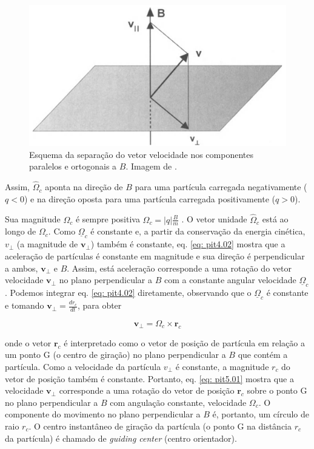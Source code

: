 \documentclass[12pt,oneside,a4paper]{abntex2}
\begin{document}
\begin{figure}[h]
\centering
\includegraphics[scale=0.6]{deconposisao.png} 
\caption{Esquema da separação do vetor velocidade nos componentes paralelos e ortogonais a $B$. Imagem de \cite[Cap 2]{bittencourt}.}
\end{figure}

Assim, $\hat{\Omega}_c$ aponta na direção de $B$ para uma partícula carregada negativamente
($q < 0$) e na direção oposta para uma partícula carregada positivamente ($q > 0$).

Sua magnitude $\Omega_c$ é sempre positiva $\Omega_c = |q| \frac{B}{m}$ . O vetor unidade $\hat{\Omega}_c$ está ao longo de $\Omega_c$.
Como $\underline{\Omega}_c$ é constante e, a partir da conservação da energia cinética,  $v_{\bot}$ (a
magnitude de $ \bm{v}_{\bot}$) também é constante, eq. \ref{eq: pit4.02} mostra que a aceleração de partículas
é constante em magnitude e sua direção é perpendicular a ambos, $\bm{v}_{\bot}$ e $B$. Assim, está aceleração corresponde a uma rotação do vetor velocidade $\bm{v}_{\bot}$ no plano perpendicular a $B$ com a constante angular velocidade $\underline{\Omega}_c$. Podemos integrar eq. \ref{eq: pit4.02} diretamente, observando que o $\underline{\Omega}_c$ é constante e tomando  $\bm{v}_{\bot} = \frac{dr_c}{dt}$, para obter

\begin{equation}
\label{eq: pit5.02}
\bm{v}_{\bot} = \Omega_c \times \bm{r}_c
\end{equation}

onde o vetor $\bm{r}_c$ é interpretado como o vetor de posição de partícula em relação a um ponto G (o centro de giração) no plano perpendicular a $B$ que contém a partícula. Como a velocidade da partícula $v_{\bot}$ é constante, a magnitude $r_c$ do vetor de posição também é constante. Portanto, eq. \ref{eq: pit5.01} mostra que a velocidade $\bm{v}_{\bot}$ corresponde a uma rotação do vetor de posição $\bm{r}_c$ sobre o ponto G no plano perpendicular a $B$ com angulação constante, velocidade $\Omega_c$. O componente do movimento no plano perpendicular a $B$ é, portanto, um círculo de raio $r_c$. O centro instantâneo de giração da partícula (o ponto G na distância $r_c$ da partícula) é chamado de \textit{guiding center} (centro orientador).
\end{document}
